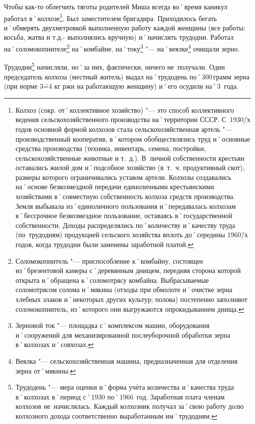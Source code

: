 Чтобы как-то облегчить тяготы родителей Миша всегда во˚время каникул работал в˚колхозе\footnote
{Колхоз (сокр. от˚коллективное хозяйство) "--- это способ коллективного ведения сельскохозяйственного производства на˚территории СССР. С~1930\=/х годов основной формой колхозов стала сельскохозяйственная артель "--- производственный кооператив, в˚котором обобществлялись труд и˚основные средства производства (техника, инвентарь, семена, постройки, сельскохозяйственные животные и т.~д.). В~личной собственности крестьян оставались жилой дом и˚подсобное хозяйство (в~т.~ч. продуктивный скот), размеры которого ограничивались уставом артели. Колхозы создавались на˚основе безвозмездной передачи единоличными крестьянскими хозяйствами в˚совместную собственность колхоза средств производства. Земля выбывала из˚единоличного пользования и˚передавалась колхозам в˚бессрочное безвозмездное пользование, оставаясь в˚государственной собственности. Доходы распределялись по˚количеству и˚качеству труда (по~трудодням) продукцией сельского хозяйства вплоть до˚середины 1960\=/х годов, когда трудодни были заменены заработной платой.}. 
Был заместителем бригадира. Приходилось бегать и˚обмерять двухметровкой выполненную работу каждой женщины (все работы: косьба, жатва и т.д.- выполнялись вручную) и˚начислять трудодни. Работал на˚соломокопнителе\footnote
{Соломокопнитель "--- приспособление к˚комбайну, состоящее из˚брезентовой камеры с˚деревянным днищем, передняя сторона которой открыта и˚обращена к˚соломотрясу комбайна. Выбрасываемые соломотрясом солома и˚мякина (отходы при обмолоте и˚очистке зерна хлебных злаков и˚некоторых других культур; полова) постепенно заполняют соломокопнитель, из˚которого они выгружаются опрокидыванием днища.}
на˚комбайне, на˚току\footnote
{Зерновой ток "--- площадка с˚комплексом машин, оборудования и˚сооружений для механизированной послеуборочной обработки зерна в˚колхозах и˚совхозах.}
"--- на˚веялке\footnote
{Веялка "--- сельскохозяйственная машина, предназначенная для отделения зерна от˚мякины.} очищали зерно.

Трудодни\footnote{Трудодень "--- мера оценки и˚форма учёта количества и˚качества труда в˚колхозах в˚период с˚1930 по˚1966~год. Заработная плата членам колхозов не~начислялась. Каждый колхозник получал за˚свою работу долю колхозного дохода соответственно выработанным им˚трудодням.} начисляли, но˚за них, фактически, ничего не~получали. Один председатель колхоза (местный житель) выдал на˚трудодень по˚300\,грамм зерна (при норме 3\==4 кг ржи на работающую женщину) и˚его осудили на˚3~года.

